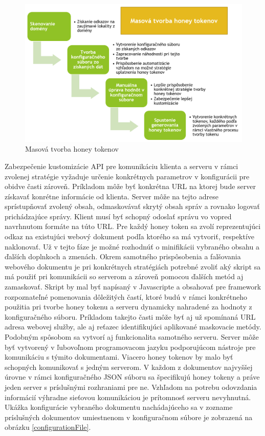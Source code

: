 \documentclass[conference, 11pt,slovak,a4paper,twoside]{IEEEtran}
\begin{document}
\begin{figure}[!t]  %
					\begin{center}
									\includegraphics[width=\linewidth]{fig/massTokenGeneration.png}
									\caption{Masová tvorba honey tokenov}
									\label{massHoneyTokenProduction}
					\end{center}
\end{figure}


Zabezpečenie kustomizácie API pre komunikáciu klienta a serveru v rámci zvolenej stratégie vyžaduje určenie konkrétnych parametrov v konfigurácii pre obidve časti zároveň. Príkladom môže byť konkrétna URL na ktorej bude server získavať konrétne informácie od klienta. Server môže na tejto adrese sprístupňovať zvolený obsah, odmaskovávať skrytý obsah správ a rovnako logovať prichádzajúce správy. Klient musí byť schopný odoslať správu vo vopred navrhnutom formáte na túto URL. Pre každý honey token sa zvolí reprezentujúci odkaz na existujúci webový dokument podľa ktorého sa má vytvoriť, respektíve naklonovať. Už v tejto fáze je možné rozhodnúť o minifikácii vybraného obsahu a ďalších doplnkoch a zmenách. Okrem samotného prispôsobenia a falšovania webového dokumentu je pri konkrétnych stratégiách potrebné zvoliť aký skript sa má použiť pri komunikácii so serverom a zároveň pomocou ďalších metód aj zamaskovať. Skript by mal byť napísaný v Javascripte a obsahovať pre framework rozpoznateľné pomenovania dôležitých častí, ktoré budú v rámci konkrétneho použitia pri tvorbe honey tokenu a serveru dynamicky nahradené za hodnoty z konfiguračného súboru. Príkladom takejto časti môže byť aj už spomínaná URL adresa webovej služby, ale aj reťazec identifikujúci aplikované maskovacie metódy. Podobným spôsobom sa vytvorí aj funkcionalita samotného serveru. Server môže byť vytvorený v ľubovoľnom programovacom jazyku podporujúcom nástroje pre komunikáciu s týmito dokumentami. Viacero honey tokenov by malo byť schopných komunikovať s jedným serverom. V každom z dokumentov najvyššej úrovne v rámci konfiguračného JSON súboru sa špecifikujú honey tokeny a práve jeden server s príslušnými rozhraniami pre ne. Vzhľadom na potrebu odovzdania informácií výhradne sieťovou komunikáciou je prítomnosť serveru nevyhnutná. Ukážka konfigurácie vybraného dokumentu nachádajúceho sa v zozname príslušných dokumentov umiestnenom v konfiguračnom súbore je zobrazená na obrázku \ref{configurationFile}.
\end{document}
